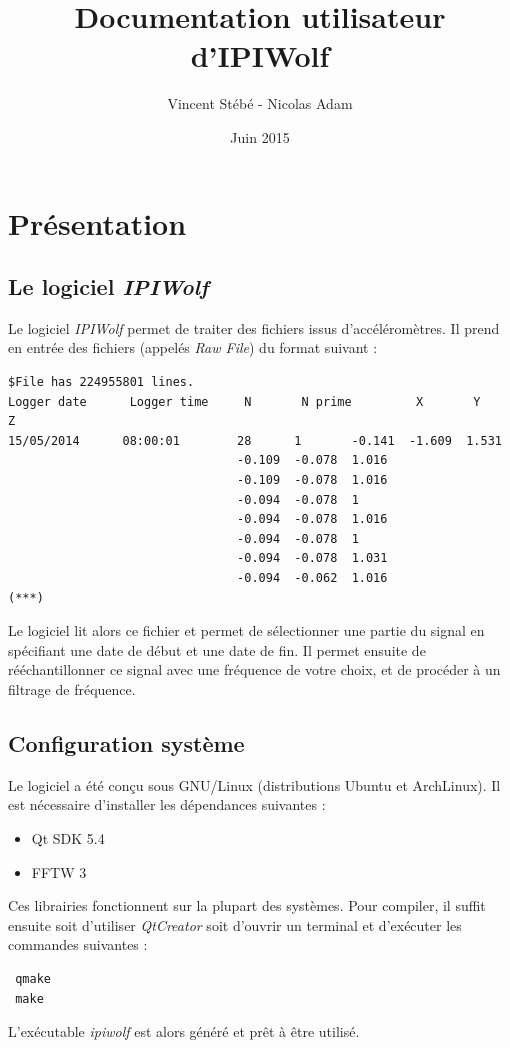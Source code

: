 \documentclass[a4paper,12pt]{article}
\begin{document}
\title{Documentation utilisateur d'IPIWolf}
\author{Vincent Stébé - Nicolas Adam}
\date{Juin 2015}

\maketitle

\newpage 
{}

\tableofcontents
\vspace{1cm}
\restoregeometry
\newpage

\section{Présentation}
\subsection{Le logiciel \emph{IPIWolf}}
Le logiciel \emph{IPIWolf} permet de traiter des fichiers issus d'accéléromètres.
Il prend en entrée des fichiers (appelés \emph{Raw File}) du format suivant :
\begin{verbatim}
$File has 224955801 lines.                                                                                                                            
Logger date      Logger time     N       N prime         X       Y       Z 
15/05/2014      08:00:01        28      1       -0.141  -1.609  1.531
                                -0.109  -0.078  1.016
                                -0.109  -0.078  1.016
                                -0.094  -0.078  1
                                -0.094  -0.078  1.016
                                -0.094  -0.078  1
                                -0.094  -0.078  1.031
                                -0.094  -0.062  1.016
(***)
\end{verbatim}
Le logiciel lit alors ce fichier et permet de sélectionner une partie du signal en spécifiant une date de début et une date de fin.
Il permet ensuite de rééchantillonner ce signal avec une fréquence de votre choix, et de procéder à un filtrage de fréquence.

\subsection{Configuration système}
Le logiciel a été conçu sous GNU/Linux (distributions Ubuntu et ArchLinux).
Il est nécessaire d'installer les dépendances suivantes :
\begin{itemize}
 \item Qt SDK 5.4
 \item FFTW 3
\end{itemize}
Ces librairies fonctionnent sur la plupart des systèmes.
Pour compiler, il suffit ensuite soit d'utiliser \emph{QtCreator} soit d'ouvrir un terminal et d'exécuter les commandes suivantes :
\begin{verbatim}
 qmake
 make
\end{verbatim}
L'exécutable \emph{ipiwolf} est alors généré et prêt à être utilisé.
\end{document}
